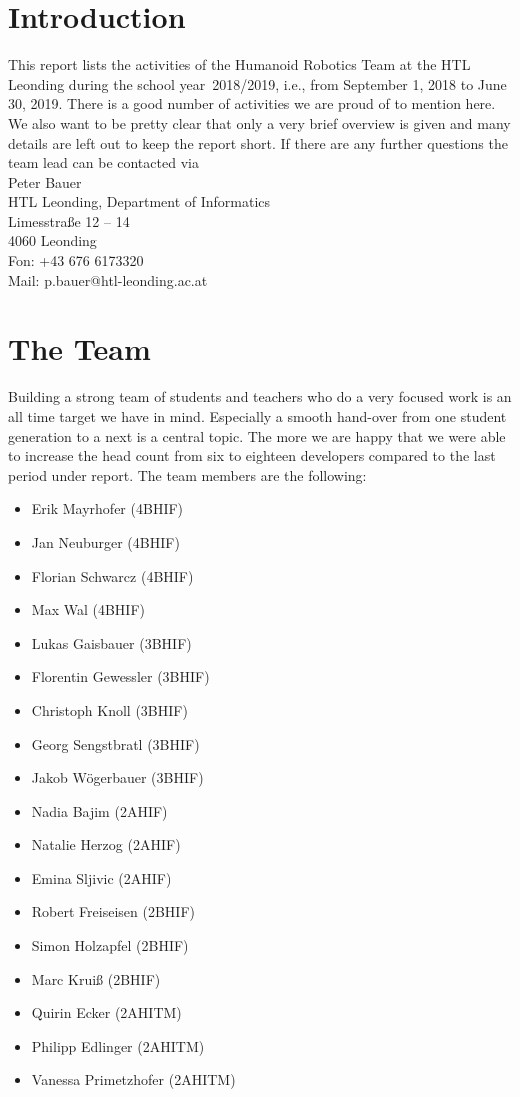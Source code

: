 \documentclass[11pt]{article}
\begin{document}
\section{Introduction}
This report lists the activities of the Humanoid Robotics Team at the HTL Leonding during the school year~2018/2019, i.e., from September 1, 2018 to June 30, 2019. There is a good number of activities we are proud of to mention here. We also want to be pretty clear that only  a very brief overview is given and many details are left out to keep the report short. If there are any further questions the team lead can be contacted via \\[1em]
Peter Bauer\\
HTL Leonding, Department of Informatics\\
Limesstraße 12 -- 14\\
4060 Leonding\\
Fon: +43 676 6173320\\
Mail: p.bauer@htl-leonding.ac.at

\section{The Team}
Building a strong team of students and teachers who do a very focused work is an all time target we have in mind. Especially a smooth hand-over from one student generation to a next is a central topic. The more we are happy that we were able to increase the head count from six  to eighteen developers compared to the last period under report. The team members are the following: 

\begin{multicols}{2}
\begin{itemize}
	\item Erik Mayrhofer (4BHIF)
	\item Jan Neuburger (4BHIF)
	\item Florian Schwarcz (4BHIF)
	\item Max Wal (4BHIF)
	\item Lukas Gaisbauer (3BHIF)
	\item Florentin Gewessler (3BHIF)
	\item Christoph Knoll (3BHIF)
	\item Georg Sengstbratl (3BHIF)
	\item Jakob Wögerbauer (3BHIF)
	\item Nadia Bajim (2AHIF)
	\item Natalie Herzog (2AHIF)
	\item Emina Sljivic (2AHIF)
	\item Robert Freiseisen (2BHIF)
	\item Simon Holzapfel (2BHIF)
	\item Marc Kruiß (2BHIF)
	\item Quirin Ecker (2AHITM)
	\item Philipp Edlinger (2AHITM)
	\item Vanessa Primetzhofer (2AHITM)
\end{itemize}
\end{multicols}
\end{document}
